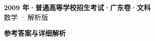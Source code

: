 \documentclass[zihao=-4, a4paper]{ctexart}
\begin{document}
\begin{center}
  {\Large\bfseries 2009 年·普通高等学校招生考试·广东卷·文科}\\[4pt]
  {\large 数学 · 解析版}
\end{center}
\medskip
{}

\clearpage
{}
\begin{center}{\Large\bfseries 参考答案与详细解析}\end{center}
\medskip

\end{document}
